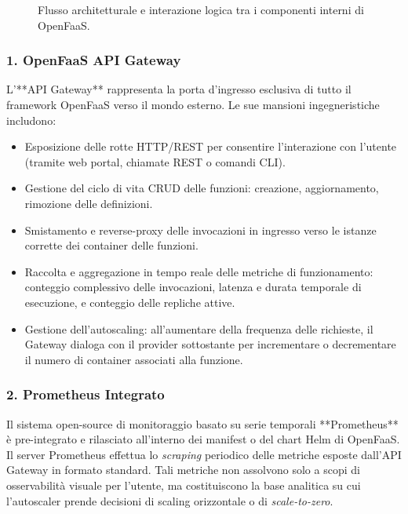 \documentclass[11pt, a4paper]{article}
\begin{document}
\begin{figure}[H]
\caption{Flusso architetturale e interazione logica tra i componenti interni di OpenFaaS.}
\label{fig:openfaas_components}
\end{figure}

\subsubsection{1. OpenFaaS API Gateway}
L'**API Gateway** rappresenta la porta d'ingresso esclusiva di tutto il framework OpenFaaS verso il mondo esterno. Le sue mansioni ingegneristiche includono:
\begin{itemize}[noitemsep]
    \item Esposizione delle rotte HTTP/REST per consentire l'interazione con l'utente (tramite web portal, chiamate REST o comandi CLI).
    \item Gestione del ciclo di vita CRUD delle funzioni: creazione, aggiornamento, rimozione delle definizioni.
    \item Smistamento e reverse-proxy delle invocazioni in ingresso verso le istanze corrette dei container delle funzioni.
    \item Raccolta e aggregazione in tempo reale delle metriche di funzionamento: conteggio complessivo delle invocazioni, latenza e durata temporale di esecuzione, e conteggio delle repliche attive.
    \item Gestione dell'autoscaling: all'aumentare della frequenza delle richieste, il Gateway dialoga con il provider sottostante per incrementare o decrementare il numero di container associati alla funzione.
\end{itemize}

\subsubsection{2. Prometheus Integrato}
Il sistema open-source di monitoraggio basato su serie temporali **Prometheus** è pre-integrato e rilasciato all'interno dei manifest o del chart Helm di OpenFaaS. Il server Prometheus effettua lo \emph{scraping} periodico delle metriche esposte dall'API Gateway in formato standard. Tali metriche non assolvono solo a scopi di osservabilità visuale per l'utente, ma costituiscono la base analitica su cui l'autoscaler prende decisioni di scaling orizzontale o di \emph{scale-to-zero}.
\end{document}
